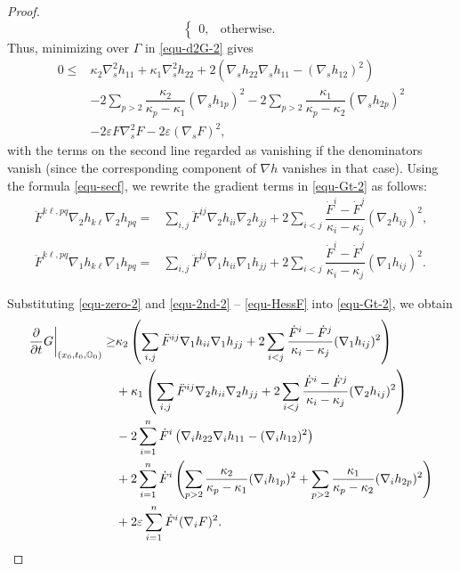 \documentclass[10pt,a4paper]{amsart}
\begin{document}
\begin{proof}
\begin{equation*}
\begin{cases}
    		0,& \mbox{otherwise}.
    	\end{cases}
    \end{equation*}
    Thus, minimizing over $\Gamma$ in \eqref{equ-d2G-2} gives
    \begin{align}
    	0 \leq & \kappa_2 \nabla_s^2 h_{11} + \kappa_1 \nabla_s^2 h_{22} + 2 \left( \nabla_s h_{22}\nabla_s h_{11} - (\nabla_s h_{12})^2  \right) \nonumber\\
    	& - 2 \sum\limits_{p>2} \dfrac{\kappa_2}{\kappa_p-\kappa_1}(\nabla_s h_{1p})^2 - 2 \sum\limits_{p>2} \dfrac{\kappa_1}{\kappa_p - \kappa_2} (\nabla_s h_{2p})^2 \nonumber \\
    	& - 2 \varepsilon F \nabla_s^2 F - 2 \varepsilon (\nabla_s F)^2,
    	\label{equ-2nd-2}
    \end{align}
    with the terms on the second line regarded as vanishing if the denominators vanish (since the corresponding component of $\nabla h$ vanishes in that case). Using the formula \eqref{equ-secf}, we rewrite the gradient terms in \eqref{equ-Gt-2} as follows:
    \begin{align}
       \ddot{F}^{k\ell,pq}\nabla_2 h_{k\ell}\nabla_2 h_{pq}= &\sum\limits_{i,j} \ddot{F}^{ij}\nabla_2 h_{ii}\nabla_2 h_{jj} + 2\sum\limits_{i< j} \dfrac{\dot{F}^i -\dot{F}^{j}}{\kappa_i-\kappa_{j}}(\nabla_2 h_{ij})^2, \\
       \ddot{F}^{k\ell,pq}\nabla_1 h_{k\ell}\nabla_1 h_{pq} =&\sum\limits_{i,j} \ddot{F}^{ij}\nabla_1 h_{ii}\nabla_1 h_{jj} + 2\sum\limits_{i< j} \dfrac{\dot{F}^i -\dot{F}^{j}}{\kappa_i-\kappa_{j}} (\nabla_1 h_{ij})^2. \label{equ-HessF}
    \end{align}
    
    Substituting \eqref{equ-zero-2} and \eqref{equ-2nd-2} -- \eqref{equ-HessF} into \eqref{equ-Gt-2}, we obtain
    \begin{align}
    	\dfrac{\partial}{\partial t}G \bigg|_{(x_0,t_0,\mathbb{O}_0)} \geq &  \kappa_2 \left( \sum\limits_{i,j} \ddot{F}^{ij}\nabla_1 h_{ii}\nabla_1 h_{jj} + 2\sum\limits_{i< j} \dfrac{\dot{F}^i -\dot{F}^{j}}{\kappa_i-\kappa_{j}} (\nabla_1 h_{ij})^2 \right) \notag\\
    	& + \kappa_1 \left( \sum\limits_{i,j} \ddot{F}^{ij}\nabla_2 h_{ii}\nabla_2 h_{jj} + 2\sum\limits_{i< j} \dfrac{\dot{F}^i -\dot{F}^{j}}{\kappa_i-\kappa_{j}}(\nabla_2 h_{ij})^2 \right) \notag\\
    	& - 2 \sum\limits_{i=1}^n \dot{F}^i \left( \nabla_i h_{22}\nabla_i h_{11} - (\nabla_i h_{12})^2  \right) \nonumber\\
    	& + 2 \sum\limits_{i=1}^n \dot{F}^i \left( \sum\limits_{p>2} \dfrac{\kappa_2}{\kappa_p-\kappa_1}(\nabla_i h_{1p})^2 + \sum\limits_{p>2} \dfrac{\kappa_1}{\kappa_p-\kappa_2} (\nabla_i h_{2p})^2  \right) \nonumber \\
    	& + 2 \varepsilon \sum\limits_{i=1}^n \dot{F}^i (\nabla_i F)^2. \label{equ-ptg22}
    \end{align}


\end{proof}
\end{document}
